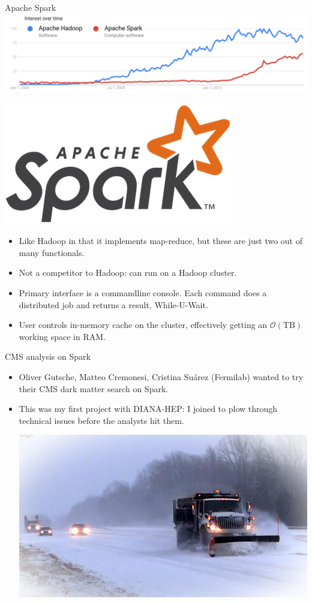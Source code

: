 \documentclass{beamer}
\begin{document}
\begin{frame}{Apache Spark}
\vspace{0.5 cm}
\includegraphics[width=\linewidth]{hadoop-versus-spark.png}

\vfill
\includegraphics[width=0.25\linewidth]{spark.png}

\begin{itemize}
\item Like Hadoop in that it implements map-reduce, but these are just two out of many functionals.
\item<2-> Not a competitor to Hadoop: can run on a Hadoop cluster.
\item<3-> Primary interface is a commandline console. Each command does a distributed job and returns a result, While-U-Wait\texttrademark.
\item<4-> User controls in-memory cache on the cluster, effectively getting an $\mathcal{O}(\mbox{TB})$ working space in RAM.
\end{itemize}
\end{frame}

\begin{frame}{CMS analysis on Spark}
\vfill
\begin{itemize}
\item Oliver Gutsche, Matteo Cremonesi, Cristina Su\'arez (Fermilab) wanted to try their CMS dark matter search on Spark.
\item This was my first project with DIANA-HEP: I joined to plow through technical issues before the analysts hit them.

\vfill
\begin{center}
\includegraphics[width=0.75\linewidth]{snowplow.jpg}
\end{center}
\end{itemize}
\end{frame}
\end{document}
